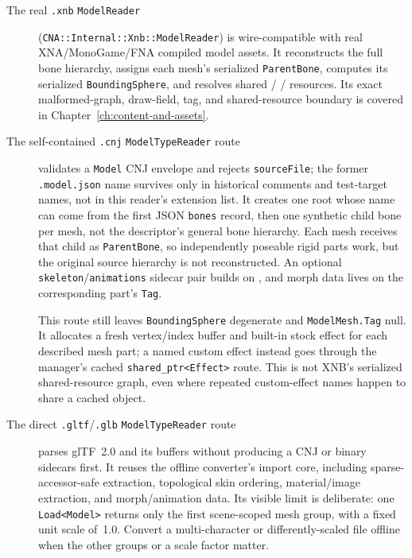 \begin{description}
  \item[The real \texttt{.xnb} \texttt{ModelReader}]
        (\texttt{CNA::Internal::Xnb::ModelReader}) is wire-compatible with real
        XNA/MonoGame/FNA compiled model assets. It reconstructs the full bone hierarchy, assigns
        each mesh's serialized \texttt{ParentBone}, computes its serialized
        \texttt{BoundingSphere}, and resolves shared /%
        / resources. Its exact malformed-graph, draw-field,
        tag, and shared-resource boundary is covered in Chapter~\ref{ch:content-and-assets}.
  \item[The self-contained \texttt{.cnj} \texttt{ModelTypeReader} route]
        validates a \texttt{Model} CNJ envelope and rejects \texttt{sourceFile}; the former
        \texttt{.model.json} name survives only in historical comments and test-target names,
        not in this reader's extension list. It creates one root whose name can come from the
        first JSON \texttt{bones} record, then one synthetic child bone per mesh, not the
        descriptor's general bone hierarchy. Each mesh receives that child as
        \texttt{ParentBone}, so independently poseable rigid parts work, but the original
        source hierarchy is not reconstructed. An optional \texttt{skeleton}/\texttt{animations}
        sidecar pair builds  on , and morph data lives
        on the corresponding part's \texttt{Tag}.

        This route still leaves \texttt{BoundingSphere} degenerate and
        \texttt{ModelMesh.Tag} null. It allocates a fresh vertex/index buffer and built-in stock
        effect for each described mesh part; a named custom effect instead goes through the
        manager's cached \texttt{shared\_ptr<Effect>} route. This is not XNB's serialized
        shared-resource graph, even where repeated custom-effect names happen to share a cached
        object.
  \item[The direct \texttt{.gltf}/\texttt{.glb} \texttt{ModelTypeReader} route]
        parses glTF~2.0 and its buffers without producing a CNJ or binary sidecars first. It
        reuses the offline converter's import core, including sparse-accessor-safe extraction,
        topological skin ordering, material/image extraction, and morph/animation data. Its
        visible limit is deliberate: one \texttt{Load<Model>} returns only the first
        scene-scoped mesh group, with a fixed unit scale of~1.0. Convert a multi-character or
        differently-scaled file offline when the other groups or a scale factor matter.


\end{description}
